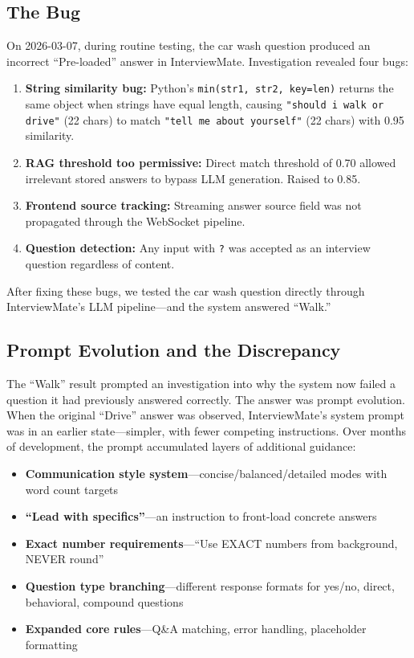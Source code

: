 \documentclass[11pt]{article}
\begin{document}
\subsection{The Bug}

On 2026-03-07, during routine testing, the car wash question produced an incorrect ``Pre-loaded'' answer in InterviewMate. Investigation revealed four bugs:

\begin{enumerate}[leftmargin=2em]
\item \textbf{String similarity bug:} Python's \texttt{min(str1, str2, key=len)} returns the same object when strings have equal length, causing \texttt{"should i walk or drive"} (22 chars) to match \texttt{"tell me about yourself"} (22 chars) with 0.95 similarity.
\item \textbf{RAG threshold too permissive:} Direct match threshold of 0.70 allowed irrelevant stored answers to bypass LLM generation. Raised to 0.85.
\item \textbf{Frontend source tracking:} Streaming answer source field was not propagated through the WebSocket pipeline.
\item \textbf{Question detection:} Any input with \texttt{?} was accepted as an interview question regardless of content.
\end{enumerate}

After fixing these bugs, we tested the car wash question directly through InterviewMate's LLM pipeline---and the system answered ``Walk.''

\subsection{Prompt Evolution and the Discrepancy}

The ``Walk'' result prompted an investigation into why the system now failed a question it had previously answered correctly. The answer was prompt evolution. When the original ``Drive'' answer was observed, InterviewMate's system prompt was in an earlier state---simpler, with fewer competing instructions. Over months of development, the prompt accumulated layers of additional guidance:

\begin{itemize}[leftmargin=2em]
\item \textbf{Communication style system}---concise/balanced/detailed modes with word count targets
\item \textbf{``Lead with specifics''}---an instruction to front-load concrete answers
\item \textbf{Exact number requirements}---``Use EXACT numbers from background, NEVER round''
\item \textbf{Question type branching}---different response formats for yes/no, direct, behavioral, compound questions
\item \textbf{Expanded core rules}---Q\&A matching, error handling, placeholder formatting
\end{itemize}
\end{document}
